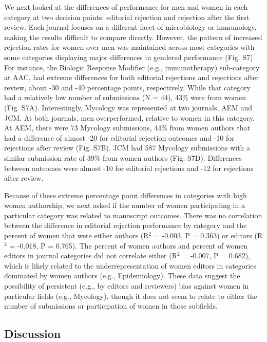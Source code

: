 \documentclass[11pt,]{article}
\begin{document}
We next looked at the differences of performance for men and women in
each category at two decision points: editorial rejection and rejection
after the first review. Each journal focuses on a different facet of
microbiology or immunology, making the results difficult to compare
directly. However, the pattern of increased rejection rates for women
over men was maintained across most categories with some categories
displaying major differences in gendered performance (Fig. S7). For
instance, the Biologic Response Modifier (e.g., immunotherapy)
sub-category at AAC, had extreme differences for both editorial
rejections and rejections after review, about -30 and -40 percentage
points, respectively. While that category had a relatively low number of
submissions (N = 44), 43\% were from women (Fig. S7A). Interestingly,
Mycology was represented at two journals, AEM and JCM. At both journals,
men overperformed, relative to women in this category. At AEM, there
were 73 Mycology submissions, 44\% from women authors that had a
difference of almost -20 for editorial rejection outcomes and -10 for
rejections after review (Fig. S7B). JCM had 587 Mycology submissions
with a similar submission rate of 39\% from women authors (Fig. S7D).
Differences between outcomes were almost -10 for editorial rejections
and -12 for rejections after review.

Because of these extreme percentage point differences in categories with
high women authorship, we next asked if the number of women
participating in a particular category was related to manuscript
outcomes. There was no correlation between the difference in editorial
rejection performance by category and the percent of women that were
either authors (R\({^2}\) = -0.003, P = 0.363) or editors (R\({^2}\) =
-0.018, P = 0.765). The percent of women authors and percent of women
editors in journal categories did not correlate either (R\({^2}\) =
-0.007, P = 0.682), which is likely related to the underrepresentation
of women editors in categories dominated by women authors (e.g.,
Epidemiology). These data suggest the possibility of persistent (e.g.,
by editors and reviewers) bias against women in particular fields (e.g.,
Mycology), though it does not seem to relate to either the number of
submissions or participation of women in those subfields.

\subsection{Discussion}\label{discussion}
\end{document}
